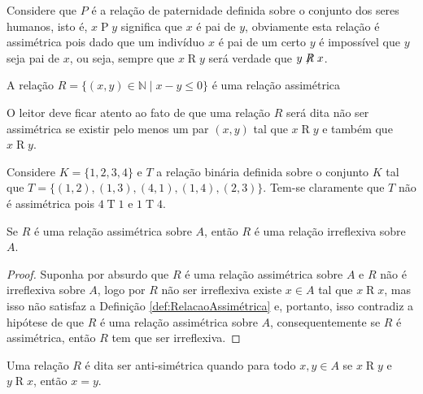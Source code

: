 \begin{example}
	Considere que $P$ é a relação de paternidade definida sobre o conjunto dos seres humanos, isto é, $x \mathrel{P} y$ significa que $x$ é pai de $y$, obviamente esta relação é assimétrica pois dado que um indivíduo $x$ é pai de um certo $y$ é impossível que $y$ seja pai de $x$, ou seja, sempre que $x \mathrel{R} y$ será verdade que $y \centernot{R} x$.
\end{example}

\begin{example}
	A relação $R = \{(x, y) \in \mathbb{N} \mid x - y \leq 0\}$ é uma relação assimétrica 
\end{example}

O leitor deve ficar atento ao fato de que uma relação $R$ será dita não ser assimétrica se existir pelo menos um par $(x,y)$ tal que $x \mathrel{R} y$ e também que  $x \mathrel{R} y$.

\begin{example}
	Considere  $K = \{1, 2, 3, 4\}$ e $T$ a relação binária definida sobre o conjunto $K$ tal que $T = \{(1,2), (1, 3), (4, 1), (1, 4), (2, 3)\}$. Tem-se claramente que $T$ não é assimétrica pois $4 \mathrel{T} 1$ e $1 \mathrel{T} 4$.
\end{example}


\begin{theorem}
	Se $R$ é uma relação assimétrica sobre $A$, então $R$ é uma relação irreflexiva sobre $A$.
\end{theorem}

\begin{proof}
	Suponha por absurdo que $R$ é uma relação assimétrica sobre $A$ e $R$ não é irreflexiva sobre $A$, logo por $R$ não ser irreflexiva existe $x \in A$ tal que  $x \mathrel{R} x$, mas isso não satisfaz a Definição \ref{def:RelacaoAssimétrica} e, portanto, isso contradiz a hipótese de que $R$ é uma relação assimétrica sobre $A$, consequentemente se $R$ é assimétrica, então $R$ tem que ser irreflexiva. 
\end{proof}

\begin{definition}\label{def:RelacaoAntiSimétrica}
	Uma relação $R$ é dita ser anti-simétrica quando para todo $x, y \in A$ se $x \mathrel{R} y$ e $y \mathrel{R} x$, então $x = y$.
\end{definition}

